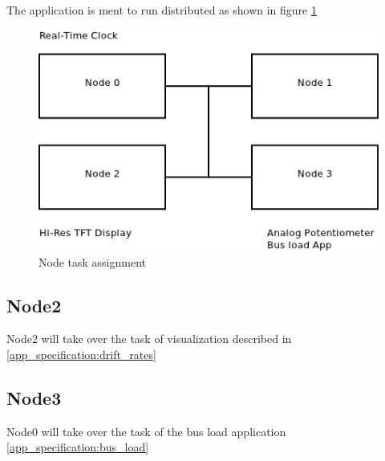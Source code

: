 The application is ment to run distributed 
as shown in figure \ref{fig:node_task_assignment} 

\begin{figure}[ht]
 \centering
 \includegraphics[scale=0.8]{../images/node_tasks.png}
 \caption{Node task assignment}
 \label{fig:node_task_assignment}
\end{figure}


\subsection{Node2}
Node2 will take over the task of visualization described in
\ref{app_specification:drift_rates} 

\subsection{Node3}
Node0 will take over the task of the bus load application
\ref{app_specification:bus_load} 